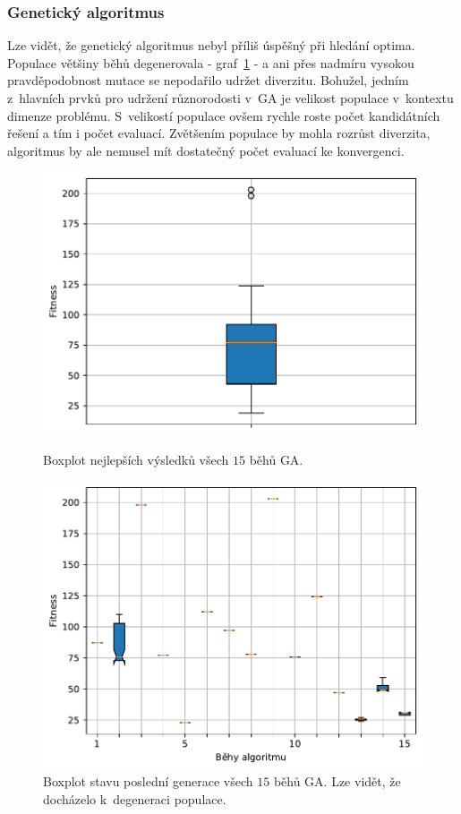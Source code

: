 \subsubsection{Genetický algoritmus}
Lze vidět, že genetický algoritmus nebyl příliš úspěšný při hledání optima. Populace většiny běhů degenerovala - graf~\ref{fg:hifu:ga:lastGen} - a ani přes nadmíru vysokou pravděpodobnost mutace se nepodařilo udržet diverzitu. Bohužel, jedním z~hlavních prvků pro udržení různorodosti v~GA je velikost populace v~kontextu dimenze problému. S~velikostí populace ovšem rychle roste počet kandidátních řešení a tím i počet evaluací. Zvětšením populace by mohla rozrůst diverzita, algoritmus by ale nemusel mít dostatečný počet evaluací ke konvergenci.
\begin{figure}[H]
\begin{minipage}[t]{0.475\linewidth}
\includegraphics[width=\linewidth]{obrazky-figures/statistics/HIFU/blob/4/GA/bestsBoxplot_WithOutliers.pdf}
\caption{Boxplot nejlepších výsledků všech $15$ běhů GA.}
\label{fg:hifu:ga:best}
\end{minipage}
\hfill
\begin{minipage}[t]{0.475\linewidth}
\includegraphics[width=\linewidth]{obrazky-figures/statistics/HIFU/blob/4/GA/lastGenBoxplots.pdf}
\caption{Boxplot stavu poslední generace všech $15$ běhů GA. Lze vidět, že docházelo k~degeneraci populace.}
\label{fg:hifu:ga:lastGen}
\end{minipage}
\end{figure}


